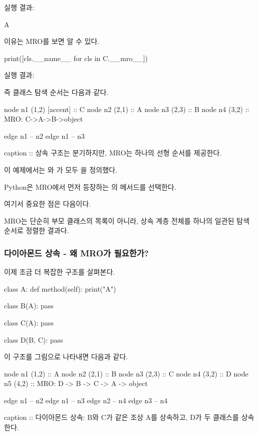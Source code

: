 실행 결과:

\begin{dhkzsh}
A
\end{dhkzsh}

이유는 MRO를 보면 알 수 있다.

\begin{dhkcode}
print([cls.__name__ for cls in C.__mro__])
\end{dhkcode}

실행 결과:

\begin{dhkzsh}
['C', 'A', 'B', 'object']
\end{dhkzsh}

즉 클래스 탐색 순서는 다음과 같다.

\begin{dhkgraph}
node n1 (1,2) [accent] :: C
node n2 (2,1) :: A
node n3 (2,3) :: B
node n4 (3,2) :: MRO: C->A->B->object

edge n1 -- n2
edge n1 -- n3

caption :: 상속 구조는 분기하지만, MRO는 하나의 선형 순서를 제공한다.
\end{dhkgraph}

이 예제에서는 와 가 모두 을 정의했다.

Python은 MRO에서 먼저 등장하는 의 메서드를 선택한다.

여기서 중요한 점은 다음이다.

MRO는 단순히 부모 클래스의 목록이 아니라, 상속 계층 전체를 하나의 일관된 탐색 순서로 정렬한 결과다.

\subsubsection{다이아몬드 상속 - 왜 MRO가 필요한가?}

이제 조금 더 복잡한 구조를 살펴본다.

\begin{dhkcode}
class A:
    def method(self):
        print("A")


class B(A):
    pass


class C(A):
    pass


class D(B, C):
    pass
\end{dhkcode}

이 구조를 그림으로 나타내면 다음과 같다.

\begin{dhkgraph}
node n1 (1,2) :: A
node n2 (2,1) :: B
node n3 (2,3) :: C
node n4 (3,2) :: D
node n5 (4,2) :: MRO: D -> B -> C -> A -> object

edge n1 -- n2
edge n1 -- n3
edge n2 -- n4
edge n3 -- n4

caption :: 다이아몬드 상속: B와 C가 같은 조상 A를 상속하고, D가 두 클래스를 상속한다.
\end{dhkgraph}

